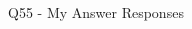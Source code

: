 


\begin{frame}{Q55 - My Answer Responses}
    \vspace{-0.6cm}
    \begin{multicols}{1}

  

    \begin{minipage}{\linewidth}
    \RaggedRight\textbf{\tiny {}} \\ 
    \vspace{4.00pt}
    \end{minipage}
    \vspace{10pt}

    \end{multicols}
\end{frame}

